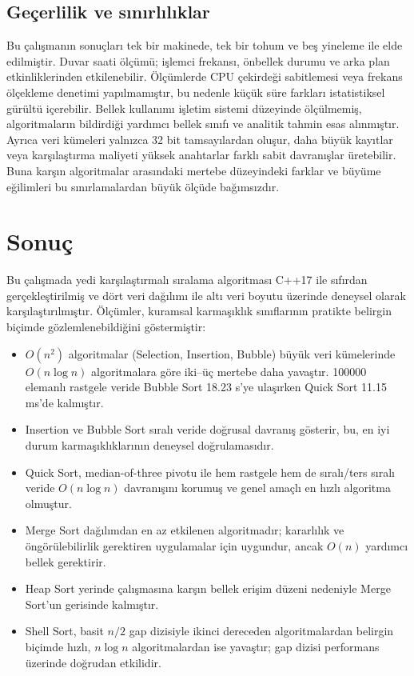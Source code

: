 \documentclass[12pt,a4paper]{article}
\begin{document}
\subsection{Geçerlilik ve sınırlılıklar}

Bu çalışmanın sonuçları tek bir makinede, tek bir tohum ve beş yineleme ile elde
edilmiştir. Duvar saati ölçümü; işlemci frekansı, önbellek durumu ve arka plan
etkinliklerinden etkilenebilir. Ölçümlerde CPU çekirdeği sabitlemesi veya
frekans ölçekleme denetimi yapılmamıştır, bu nedenle küçük süre farkları
istatistiksel gürültü içerebilir. Bellek kullanımı işletim sistemi düzeyinde
ölçülmemiş, algoritmaların bildirdiği yardımcı bellek sınıfı ve analitik tahmin
esas alınmıştır. Ayrıca veri kümeleri yalnızca 32 bit tamsayılardan oluşur,
daha büyük kayıtlar veya karşılaştırma maliyeti yüksek anahtarlar farklı sabit
davranışlar üretebilir. Buna karşın algoritmalar arasındaki mertebe düzeyindeki
farklar ve büyüme eğilimleri bu sınırlamalardan büyük ölçüde bağımsızdır.

\section{Sonuç}

Bu çalışmada yedi karşılaştırmalı sıralama algoritması C++17 ile sıfırdan
gerçekleştirilmiş ve dört veri dağılımı ile altı veri boyutu üzerinde deneysel
olarak karşılaştırılmıştır. Ölçümler, kuramsal karmaşıklık sınıflarının pratikte
belirgin biçimde gözlemlenebildiğini göstermiştir:

\begin{itemize}
  \item $O(n^2)$ algoritmalar (Selection, Insertion, Bubble) büyük veri
        kümelerinde $O(n \log n)$ algoritmalara göre iki--üç mertebe daha
        yavaştır. 100000 elemanlı rastgele veride Bubble Sort 18.23 s'ye
        ulaşırken Quick Sort 11.15 ms'de kalmıştır.
  \item Insertion ve Bubble Sort sıralı veride doğrusal davranış gösterir,
        bu, en iyi durum karmaşıklıklarının deneysel doğrulamasıdır.
  \item Quick Sort, median-of-three pivotu ile hem rastgele hem de sıralı/ters
        sıralı veride $O(n \log n)$ davranışını korumuş ve genel amaçlı en hızlı
        algoritma olmuştur.
  \item Merge Sort dağılımdan en az etkilenen algoritmadır; kararlılık ve
        öngörülebilirlik gerektiren uygulamalar için uygundur, ancak $O(n)$
        yardımcı bellek gerektirir.
  \item Heap Sort yerinde çalışmasına karşın bellek erişim düzeni nedeniyle
        Merge Sort'un gerisinde kalmıştır.
  \item Shell Sort, basit $n/2$ gap dizisiyle ikinci dereceden algoritmalardan
        belirgin biçimde hızlı, $n \log n$ algoritmalardan ise yavaştır; gap
        dizisi performans üzerinde doğrudan etkilidir.
\end{itemize}
\end{document}
